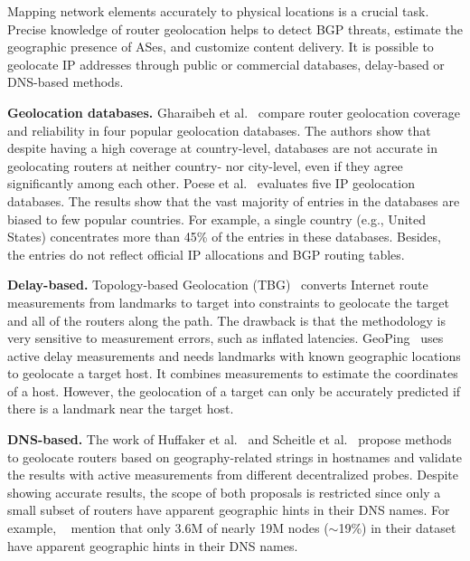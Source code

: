 	Mapping network elements accurately to physical locations is a crucial task. Precise knowledge of router geolocation helps to detect BGP threats, estimate the geographic presence of ASes, and customize content delivery. It is possible to geolocate IP addresses through public or commercial databases, delay-based or DNS-based methods.

	\textbf{Geolocation databases.} Gharaibeh et al.~\cite{Gharaibeh:2017:LRG:3131365.3131380} compare router geolocation coverage and reliability in four popular geolocation databases. The authors show that despite having a  high coverage at country-level, databases are not accurate in geolocating routers at neither country- nor city-level, even if they agree significantly among each other. Poese et al.~\cite{Poese:2011:IGD:1971162.1971171} evaluates five IP geolocation databases. The results show that the vast majority of entries in the databases are biased to few popular countries. For example, a single country (e.g., United States) concentrates more than 45\% of the entries in these databases. Besides, the entries do not reflect official IP allocations and BGP routing tables.

	\textbf{Delay-based.} Topology-based Geolocation (TBG)~\cite{Katz-Bassett:2006:TIG:1177080.1177090} converts Internet route measurements from landmarks to target into constraints to geolocate the target and all of the routers along the path. The drawback is that the methodology is very sensitive to measurement errors, such as inflated latencies. GeoPing~\cite{Padmanabhan:2001:IGM:383059.383073} uses active delay measurements and needs landmarks with known geographic locations to geolocate a target host. It combines measurements to estimate the coordinates of a host. However, the geolocation of a target can only be accurately predicted if there is a landmark near the target host.

	\textbf{DNS-based.} The work of Huffaker et al.~\cite{Huffaker:2014:DDR:2656877.2656879} and Scheitle et al.~\cite{8002903} propose methods to geolocate routers based on geography-related strings in hostnames and validate the results with active measurements from different decentralized probes. Despite showing accurate results, the scope of both proposals is restricted since only a small subset of routers have apparent geographic hints in their DNS names. For example, ~\cite{Huffaker:2014:DDR:2656877.2656879} mention that only 3.6M of nearly 19M nodes ($\sim$19\%) in their dataset have apparent geographic hints in their DNS names. 

